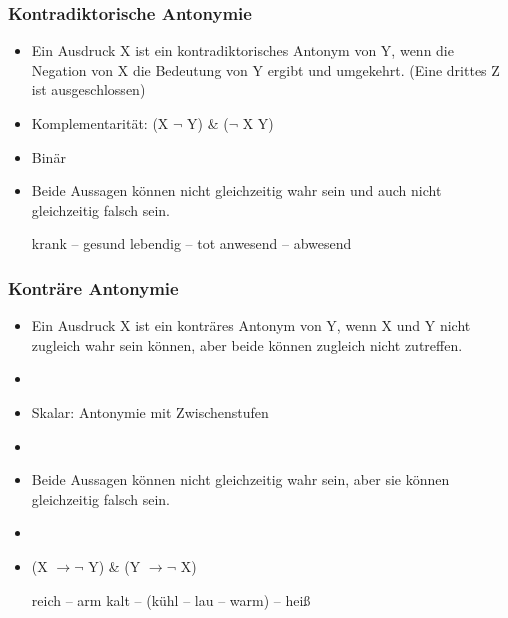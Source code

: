 
\begin{frame}
\frametitle{Kontradiktorische Antonymie}

\begin{itemize}
	\item 
Ein Ausdruck X ist ein kontradiktorisches Antonym von Y, wenn die Negation von X die Bedeutung von Y ergibt und umgekehrt. (Eine drittes Z ist ausgeschlossen)
	\item Komplementarität: (X \ras $\lnot$ Y) \& ($\lnot$ X  \ras Y)
	\item Binär
	\item Beide Aussagen können nicht gleichzeitig wahr sein und auch nicht gleichzeitig falsch sein.
	
	\eal
		\ex krank -- gesund
		\ex lebendig -- tot
		\ex anwesend -- abwesend
	\zl
	
\end{itemize}

\end{frame}



\begin{frame}
\frametitle{Konträre Antonymie}

\begin{itemize}
	\item
Ein Ausdruck X ist ein konträres Antonym von Y, wenn X und Y nicht zugleich wahr sein können, aber beide können zugleich nicht zutreffen.
	\item[]
	\item Skalar: Antonymie mit Zwischenstufen
	\item[]
	\item Beide Aussagen können nicht gleichzeitig wahr sein, aber sie können gleichzeitig falsch sein.
	\item[]
	\item (X $\rightarrow \lnot$ Y) \& (Y $\rightarrow \lnot$ X)
	
	\eal
		\ex reich -- arm
		\ex kalt -- (kühl -- lau -- warm) -- heiß
	\zl
	
\end{itemize}

\end{frame}




